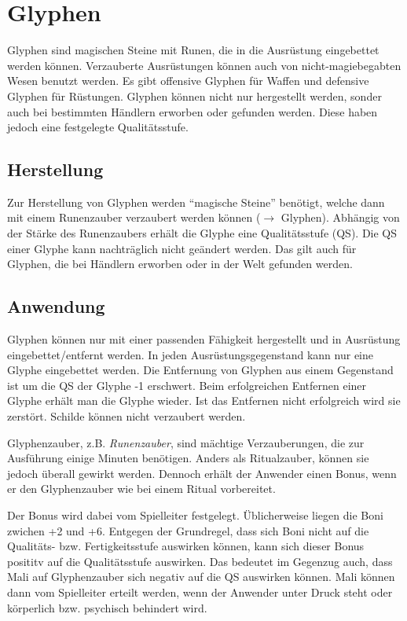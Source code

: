 {\let\clearpage\relax\chapter{Glyphen}}
Glyphen sind magischen Steine mit Runen, die in die Ausrüstung eingebettet werden können. Verzauberte Ausrüstungen können auch von nicht-magiebegabten Wesen benutzt werden. Es gibt offensive Glyphen für Waffen und defensive Glyphen für Rüstungen. Glyphen können nicht nur hergestellt werden, sonder auch bei bestimmten Händlern erworben oder gefunden werden. Diese haben jedoch eine festgelegte Qualitätsstufe.

\section{Herstellung}
Zur Herstellung von Glyphen werden "`magische Steine"' benötigt, welche dann mit einem Runenzauber verzaubert werden können ($\rightarrow$ Glyphen). Abhängig von der Stärke des Runenzaubers erhält die Glyphe eine Qualitätsstufe (QS). Die QS einer Glyphe kann nachträglich nicht geändert werden. Das gilt auch für Glyphen, die bei Händlern erworben oder in der Welt gefunden werden.

\section{Anwendung}
Glyphen können nur mit einer passenden Fähigkeit hergestellt und in Ausrüstung eingebettet/entfernt werden. In jeden Ausrüstungsgegenstand kann nur eine Glyphe eingebettet werden. Die Entfernung von Glyphen aus einem Gegenstand ist um die QS der Glyphe -1 erschwert. Beim erfolgreichen Entfernen einer Glyphe erhält man die Glyphe wieder. Ist das Entfernen nicht erfolgreich wird sie zerstört. Schilde können nicht verzaubert werden.

Glyphenzauber, z.B. \textit{Runenzauber}, sind mächtige Verzauberungen, die zur Ausführung einige Minuten benötigen. Anders als Ritualzauber, können sie jedoch überall gewirkt werden. Dennoch erhält der Anwender einen Bonus, wenn er den Glyphenzauber wie bei einem Ritual vorbereitet. 

Der Bonus wird dabei vom Spielleiter festgelegt. Üblicherweise liegen die Boni zwichen +2 und +6. Entgegen der Grundregel, dass sich Boni nicht auf die Qualitäts- bzw. Fertigkeitsstufe auswirken können, kann sich dieser Bonus posititv auf die Qualitätsstufe auswirken. Das bedeutet im Gegenzug auch, dass Mali auf Glyphenzauber sich negativ auf die QS auswirken können. Mali können dann vom Spielleiter erteilt werden, wenn der Anwender unter Druck steht oder körperlich bzw. psychisch behindert wird.

